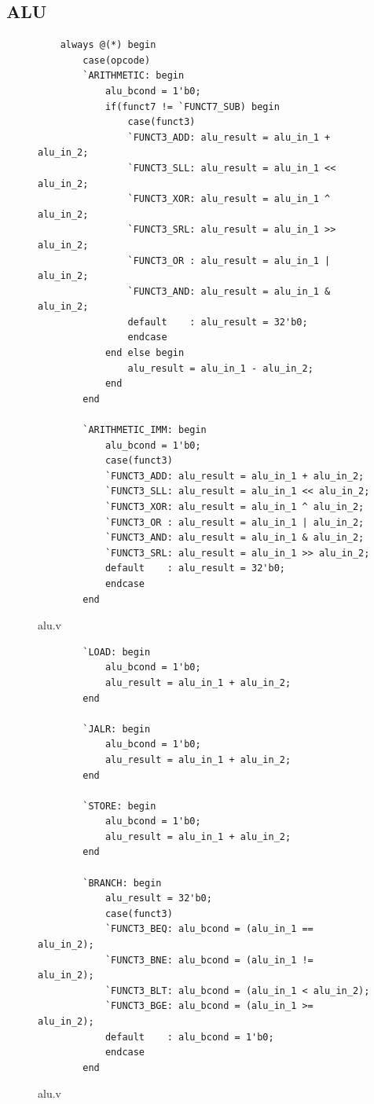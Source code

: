 \documentclass[openright, a4paper]{article}
\begin{document}
\newpage

\subsection{ALU}
\begin{figure}[!h]
    \begin{verbatim}
    always @(*) begin
        case(opcode)
        `ARITHMETIC: begin
            alu_bcond = 1'b0;
            if(funct7 != `FUNCT7_SUB) begin
                case(funct3)
                `FUNCT3_ADD: alu_result = alu_in_1 + alu_in_2;
                `FUNCT3_SLL: alu_result = alu_in_1 << alu_in_2;
                `FUNCT3_XOR: alu_result = alu_in_1 ^ alu_in_2;
                `FUNCT3_SRL: alu_result = alu_in_1 >> alu_in_2;
                `FUNCT3_OR : alu_result = alu_in_1 | alu_in_2;
                `FUNCT3_AND: alu_result = alu_in_1 & alu_in_2;
                default    : alu_result = 32'b0;
                endcase
            end else begin
                alu_result = alu_in_1 - alu_in_2;
            end
        end

        `ARITHMETIC_IMM: begin
            alu_bcond = 1'b0;
            case(funct3)
            `FUNCT3_ADD: alu_result = alu_in_1 + alu_in_2;
            `FUNCT3_SLL: alu_result = alu_in_1 << alu_in_2;
            `FUNCT3_XOR: alu_result = alu_in_1 ^ alu_in_2;
            `FUNCT3_OR : alu_result = alu_in_1 | alu_in_2;
            `FUNCT3_AND: alu_result = alu_in_1 & alu_in_2;
            `FUNCT3_SRL: alu_result = alu_in_1 >> alu_in_2;
            default    : alu_result = 32'b0;
            endcase
        end
    \end{verbatim}
    \caption{alu.v}
\end{figure}
\begin{figure}[!h]
    \begin{verbatim}
        `LOAD: begin
            alu_bcond = 1'b0;
            alu_result = alu_in_1 + alu_in_2;
        end

        `JALR: begin
            alu_bcond = 1'b0;
            alu_result = alu_in_1 + alu_in_2;
        end

        `STORE: begin
            alu_bcond = 1'b0;
            alu_result = alu_in_1 + alu_in_2;
        end

        `BRANCH: begin
            alu_result = 32'b0;
            case(funct3)
            `FUNCT3_BEQ: alu_bcond = (alu_in_1 == alu_in_2);
            `FUNCT3_BNE: alu_bcond = (alu_in_1 != alu_in_2);
            `FUNCT3_BLT: alu_bcond = (alu_in_1 < alu_in_2);
            `FUNCT3_BGE: alu_bcond = (alu_in_1 >= alu_in_2);
            default    : alu_bcond = 1'b0; 
            endcase
        end
    \end{verbatim}
    \caption{alu.v}
\end{figure}
\end{document}
